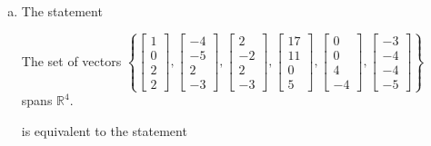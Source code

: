 \begin{exerciseAnswer}
\begin{enumerate}[(a)]
\item The statement 
\begin{center}\begin{minipage}{0.8\textwidth}
 The set of vectors \( \left\{ \left[\begin{array}{c}
1 \\
0 \\
2 \\
2
\end{array}\right] , \left[\begin{array}{c}
-4 \\
-5 \\
2 \\
-3
\end{array}\right] , \left[\begin{array}{c}
2 \\
-2 \\
2 \\
-3
\end{array}\right] , \left[\begin{array}{c}
17 \\
11 \\
0 \\
5
\end{array}\right] , \left[\begin{array}{c}
0 \\
0 \\
4 \\
-4
\end{array}\right] , \left[\begin{array}{c}
-3 \\
-4 \\
-4 \\
-5
\end{array}\right] \right\} \) spans \(\mathbb{R}^4\). 
\end{minipage}\end{center}
     is equivalent to the statement 
\begin{center}\begin{minipage}{0.8\textwidth}
 The vector equation \( x_{1} \left[\begin{array}{c}
1 \\
0 \\
2 \\
2
\end{array}\right] + x_{2} \left[\begin{array}{c}
-4 \\
-5 \\

\end{array}
\end{minipage}
\end{center}
\end{enumerate}
\end{exerciseAnswer}
